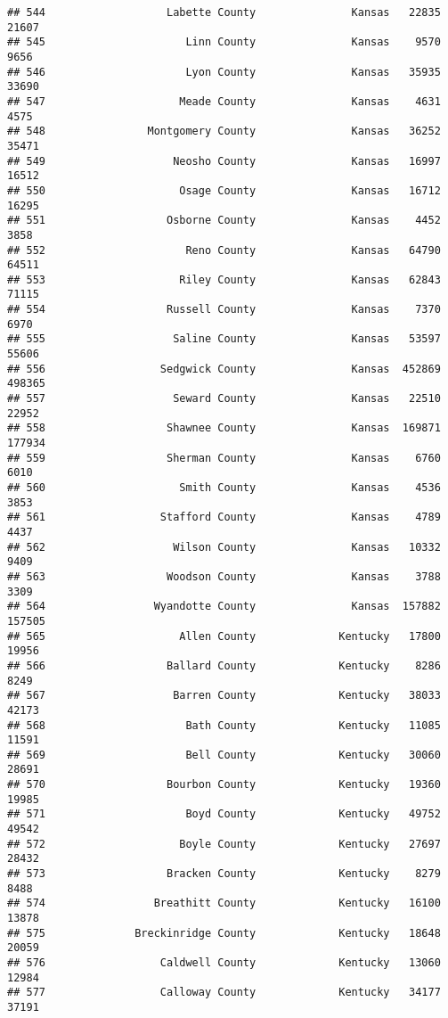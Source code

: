 \documentclass[
]{article}
\begin{document}
\begin{verbatim}
## 544                   Labette County               Kansas   22835   21607
## 545                      Linn County               Kansas    9570    9656
## 546                      Lyon County               Kansas   35935   33690
## 547                     Meade County               Kansas    4631    4575
## 548                Montgomery County               Kansas   36252   35471
## 549                    Neosho County               Kansas   16997   16512
## 550                     Osage County               Kansas   16712   16295
## 551                   Osborne County               Kansas    4452    3858
## 552                      Reno County               Kansas   64790   64511
## 553                     Riley County               Kansas   62843   71115
## 554                   Russell County               Kansas    7370    6970
## 555                    Saline County               Kansas   53597   55606
## 556                  Sedgwick County               Kansas  452869  498365
## 557                    Seward County               Kansas   22510   22952
## 558                   Shawnee County               Kansas  169871  177934
## 559                   Sherman County               Kansas    6760    6010
## 560                     Smith County               Kansas    4536    3853
## 561                  Stafford County               Kansas    4789    4437
## 562                    Wilson County               Kansas   10332    9409
## 563                   Woodson County               Kansas    3788    3309
## 564                 Wyandotte County               Kansas  157882  157505
## 565                     Allen County             Kentucky   17800   19956
## 566                   Ballard County             Kentucky    8286    8249
## 567                    Barren County             Kentucky   38033   42173
## 568                      Bath County             Kentucky   11085   11591
## 569                      Bell County             Kentucky   30060   28691
## 570                   Bourbon County             Kentucky   19360   19985
## 571                      Boyd County             Kentucky   49752   49542
## 572                     Boyle County             Kentucky   27697   28432
## 573                   Bracken County             Kentucky    8279    8488
## 574                 Breathitt County             Kentucky   16100   13878
## 575              Breckinridge County             Kentucky   18648   20059
## 576                  Caldwell County             Kentucky   13060   12984
## 577                  Calloway County             Kentucky   34177   37191

\end{verbatim}
\end{document}
